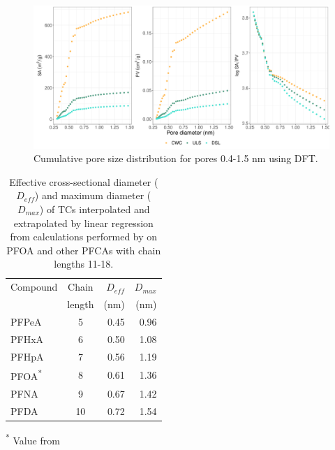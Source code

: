 \begin{figure}[htb]
    \centering
    \includegraphics[width=\textwidth]{R/figs/PZD_SAPV_C_small_plot.pdf}
    \caption{Cumulative pore size distribution for pores 0.4-1.5 nm using DFT.}
    \label{fig:PZD_small}
\end{figure}

\begin{table}
\caption{Effective cross-sectional diameter ($D_{eff}$) and maximum diameter ($D_{max}$) of TCs interpolated and extrapolated by linear regression from calculations performed by \cite{inoue2012size} on PFOA and other PFCAs with chain lengths 11-18.}
\centering
\begin{threeparttable}
\label{tab:molecsize}
\begin{tabular}{lcrr}
\toprule
Compound & Chain & $D_{eff}$ & $D_{max}$ \\ 
& length & (nm) & (nm) \\ \midrule
PFPeA & 5  & 0.45  & 0.96  \\
PFHxA & 6  & 0.50  & 1.08  \\
PFHpA & 7  & 0.56  & 1.19  \\
PFOA\textsuperscript{*} & 8 & 0.61 & 1.36 \\
PFNA & 9 & 0.67 & 1.42  \\
PFDA & 10 & 0.72 & 1.54  \\ \bottomrule                                    
\end{tabular}
\begin{tablenotes}
\item \textsuperscript{*} Value from \cite{inoue2012size}
\end{tablenotes}
\end{threeparttable}
\end{table}

